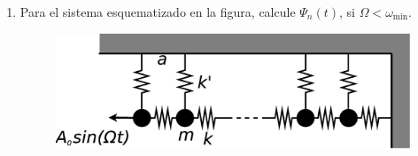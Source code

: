 \documentclass[11pt,spanish]{article}
\begin{document}
\begin{enumerate}
    
    \item Para el sistema esquematizado en la figura, calcule $\Psi_{n}(t)$, si
    $\Omega<\omega_\text{min}$.

    \begin{figure}[H]
        \centering{}\includegraphics[clip,scale=0.25]{figs/ej1-17}
    \end{figure}


\end{enumerate}
\end{document}
